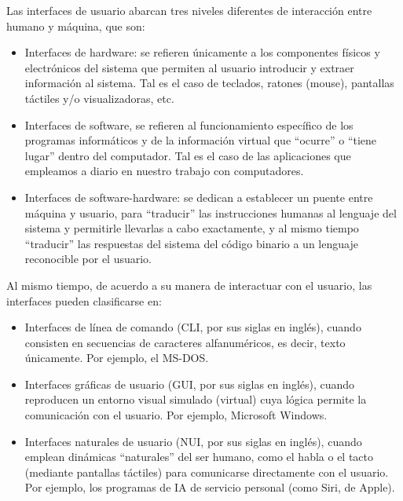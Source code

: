 Las interfaces de usuario abarcan tres niveles diferentes de interacción entre humano y máquina, que son:

\begin{itemize}
\item Interfaces de hardware: se refieren únicamente a los componentes físicos y electrónicos del sistema que permiten al usuario introducir y extraer información al sistema. Tal es el caso de teclados, ratones (mouse), pantallas táctiles y/o visualizadoras, etc.
\item Interfaces de software, se refieren al funcionamiento específico de los programas informáticos y de la información virtual que ``ocurre'' o ``tiene lugar'' dentro del computador. Tal es el caso de las aplicaciones que empleamos a diario en nuestro trabajo con computadores.
\item Interfaces de software-hardware: se dedican a establecer un puente entre máquina y usuario, para ``traducir'' las instrucciones humanas al lenguaje del sistema y permitirle llevarlas a cabo exactamente, y al mismo tiempo ``traducir'' las respuestas del sistema del código binario a un lenguaje reconocible por el usuario.
\end{itemize}

Al mismo tiempo, de acuerdo a su manera de interactuar con el usuario, las interfaces pueden clasificarse en:

\begin{itemize}
\item Interfaces de línea de comando (CLI, por sus siglas en inglés), cuando consisten en secuencias de caracteres alfanuméricos, es decir, texto únicamente. Por ejemplo, el MS-DOS.
\item Interfaces gráficas de usuario (GUI, por sus siglas en inglés), cuando reproducen un entorno visual simulado (virtual) cuya lógica permite la comunicación con el usuario. Por ejemplo, Microsoft Windows.
\item Interfaces naturales de usuario (NUI, por sus siglas en inglés), cuando emplean dinámicas “naturales” del ser humano, como el habla o el tacto (mediante pantallas táctiles) para comunicarse directamente con el usuario. Por ejemplo, los programas de IA de servicio personal (como Siri, de Apple).
\end{itemize}


